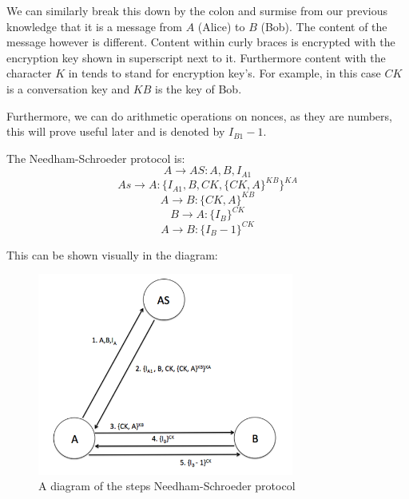 \documentclass{article}
\begin{document}
We can similarly break this down by the colon and surmise from our previous
knowledge that it is a message from $A$ (Alice) to $B$ (Bob). The content of the
message however is different. Content within curly braces is encrypted with
the encryption key shown in superscript next to it. Furthermore content with the
character $K$ in tends to stand for encryption key’s. For example, in this case
$CK$ is a conversation key and $KB$ is the key of Bob.

Furthermore, we can do arithmetic operations on nonces, as they are numbers,
this will prove useful later and is denoted by $I_{B1} - 1$.



The Needham-Schroeder protocol is:
\begin{equation}
    A \rightarrow AS: A, B, I_{A1}
\end{equation}
\begin{equation}
    As \rightarrow A: \{ I_{A1}, B, CK, \{CK, A\}^{KB} \}^{KA}
\end{equation}
\begin{equation}
    A \rightarrow B: \{CK, A\}^{KB}
\end{equation}
\begin{equation}
    B \rightarrow A: \{I_B\}^{CK}
\end{equation}
\begin{equation}
    A \rightarrow B: \{I_B - 1\}^{CK}
\end{equation}

\newpage
This can be shown visually in the diagram:
\begin{figure}[ht]
    \centering
    \includegraphics[width=0.75\textwidth]{protocolDiagram.png}
    \caption{A diagram of the steps Needham-Schroeder protocol}
    \label{fig:protocolDiagram}
\end{figure}
\end{document}
